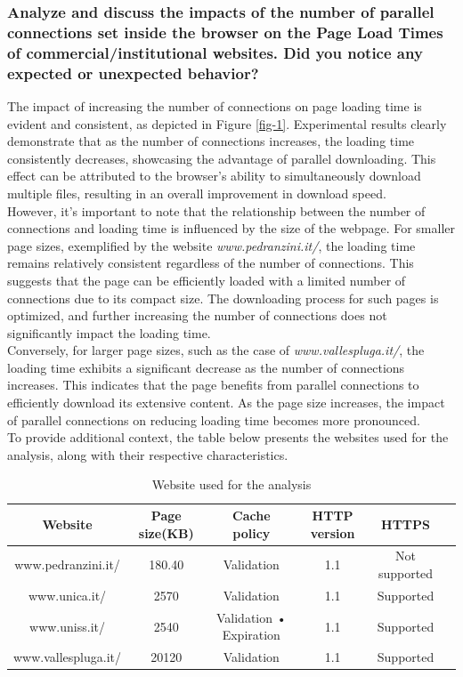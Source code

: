 \documentclass[eng]{class}
\begin{document}
\subsubsection*{Analyze and discuss the impacts of the number of parallel connections set inside the browser
  on the Page Load Times of commercial/institutional websites. Did you notice any expected or
  unexpected behavior?}
The impact of increasing the number of connections on page loading time is evident and consistent, as depicted in Figure \ref{fig-1}.
Experimental results clearly demonstrate that as the number of connections increases, the loading time consistently decreases,
showcasing the advantage of parallel downloading.
This effect can be attributed to the browser's ability to simultaneously download multiple files, resulting in an overall improvement in download speed.\\
However, it's important to note that the relationship between the number of connections and loading time is influenced by the size of the webpage.
For smaller page sizes, exemplified by the website \textit{www.pedranzini.it/}, the loading time remains relatively consistent regardless
of the number of connections. This suggests that the page can be efficiently loaded with a limited number of connections due to its compact size.
The downloading process for such pages is optimized, and further increasing the number of connections does not significantly impact the loading time.\\
Conversely, for larger page sizes, such as the case of \textit{www.vallespluga.it/}, the loading time exhibits a significant decrease as
the number of connections increases. This indicates that the page benefits from parallel connections to efficiently download its extensive content.
As the page size increases, the impact of parallel connections on reducing loading time becomes more pronounced.\\
To provide additional context, the table below presents the websites used for the analysis, along with their respective characteristics.
\begin{table}[H]
  \tiny
  \centering
  \begin{tabular}{|c|c|c|c|c|c|}
    \hline
    \linewidth=0cm
    Website             & Page size(KB) & Cache policy            & HTTP version & HTTPS         \\
    \hline
    www.pedranzini.it/  & 180.40        & Validation              & 1.1          & Not supported \\
    www.unica.it/       & 2570          & Validation              & 1.1          & Supported     \\
    www.uniss.it/       & 2540          & Validation • Expiration & 1.1          & Supported     \\
    www.vallespluga.it/ & 20120         & Validation              & 1.1          & Supported     \\
    \hline
  \end{tabular}
  \caption{Website used for the analysis}
  \label{tab-1}
\end{table}
\end{document}

